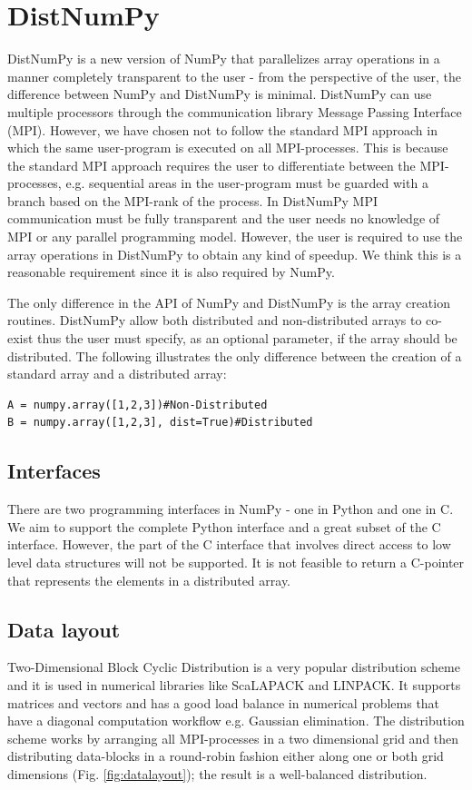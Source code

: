 \documentclass{sigplanconf}
\begin{document}
\section{DistNumPy}
DistNumPy is a new version of NumPy that parallelizes array operations in a manner completely transparent to the user - from the perspective of the user, the difference between NumPy and DistNumPy is minimal. DistNumPy can use multiple processors through the communication library Message Passing Interface (MPI)\cite{mpi}. However, we have chosen not to follow the standard MPI approach in which the same user-program is executed on all MPI-processes. This is because the standard MPI approach requires the user to differentiate between the MPI-processes, e.g. sequential areas in the user-program must be guarded with a branch based on the MPI-rank of the process. In DistNumPy MPI communication must be fully transparent and the user needs no knowledge of MPI or any parallel programming model. However, the user is required to use the array operations in DistNumPy to obtain any kind of speedup. We think this is a reasonable requirement since it is also required by NumPy.

The only difference in the API of NumPy and DistNumPy is the array creation routines. DistNumPy allow both distributed and non-distributed arrays to co-exist thus the user must specify, as an optional parameter, if the array should be distributed. The following illustrates the only difference between the creation of a standard array and a distributed array:
\lstset{frame=none, xleftmargin=0mm, numbers=none}
\begin{lstlisting}
A = numpy.array([1,2,3])#Non-Distributed
B = numpy.array([1,2,3], dist=True)#Distributed
\end{lstlisting}
\lstset{frame=single, xleftmargin=5mm, numbers=left}


\subsection{Interfaces}
There are two programming interfaces in NumPy - one in Python and one in C. We aim to support the complete Python interface and a great subset of the C interface. However, the part of the C interface that involves direct access to low level data structures will not be supported. It is not feasible to return a C-pointer that represents the elements in a distributed array.


\subsection{Data layout}
Two-Dimensional Block Cyclic Distribution is a very popular distribution scheme and it is used in numerical libraries like ScaLAPACK\cite{Blackford96} and LINPACK\cite{linpack79}. It supports matrices and vectors and has a good load balance in numerical problems that have a diagonal computation workflow e.g. Gaussian elimination. The distribution scheme works by arranging all MPI-processes in a two dimensional grid and then distributing data-blocks in a round-robin fashion either along one or both grid dimensions (Fig. \ref {fig:datalayout}); the result is a well-balanced distribution.
\end{document}

